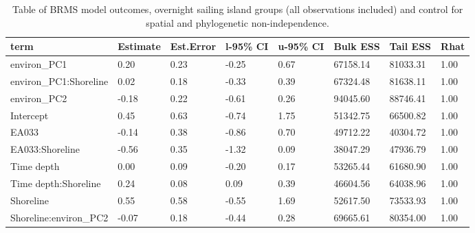 \begin{table}[ht]
\centering
\begin{tabular}{p{3cm}p{1.35cm}p{1.35cm}p{1.35cm}p{1.35cm}p{1.35cm}p{1.35cm}p{1.35cm}}
  \toprule
term & Estimate & Est.Error & l-95\% CI & u-95\% CI & Bulk ESS & Tail ESS & Rhat \\ 
  \midrule
environ\_PC1 & 0.20 & 0.23 & -0.25 & 0.67 & 67158.14 & 81033.31 & 1.00 \\ 
  environ\_PC1:Shoreline & 0.02 & 0.18 & -0.33 & 0.39 & 67324.48 & 81638.11 & 1.00 \\ 
  environ\_PC2 & -0.18 & 0.22 & -0.61 & 0.26 & 94045.60 & 88746.41 & 1.00 \\ 
  Intercept & 0.45 & 0.63 & -0.74 & 1.75 & 51342.75 & 66500.82 & 1.00 \\ 
  EA033 & -0.14 & 0.38 & -0.86 & 0.70 & 49712.22 & 40304.72 & 1.00 \\ 
  EA033:Shoreline & -0.56 & 0.35 & -1.32 & 0.09 & 38047.29 & 47936.79 & 1.00 \\ 
  Time depth & 0.00 & 0.09 & -0.20 & 0.17 & 53265.44 & 61680.90 & 1.00 \\ 
  Time depth:Shoreline & 0.24 & 0.08 & 0.09 & 0.39 & 46604.56 & 64038.96 & 1.00 \\ 
  Shoreline & 0.55 & 0.58 & -0.55 & 1.69 & 52617.50 & 73533.93 & 1.00 \\ 
  Shoreline:environ\_PC2 & -0.07 & 0.18 & -0.44 & 0.28 & 69665.61 & 80354.00 & 1.00 \\ 
   \bottomrule
\end{tabular}
\caption{Table of BRMS model outcomes, overnight sailing island groups (all observations included) and control for spatial and phylogenetic non-independence.} 
\label{BRMS_effects_SBZR_control_sp}
\end{table}
